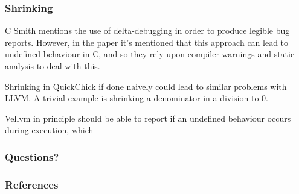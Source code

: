 \documentclass{beamer}
\begin{document}
\begin{frame}
  \frametitle{Shrinking}

  C Smith mentions the use of delta-debugging in order to produce
  legible bug reports. However, in the paper it's mentioned that this
  approach can lead to undefined behaviour in C, and so they rely upon
  compiler warnings and static analysis to deal with this.

  Shrinking in QuickChick if done naively could lead to similar
  problems with LLVM. A trivial example is shrinking a denominator in
  a division to 0.

  Vellvm in principle should be able to report if an undefined
  behaviour occurs during execution, which 
\end{frame}

\begin{frame}
  \frametitle{Questions?}

\end{frame}

\begin{frame}
  \frametitle{References}

  \nocite{*}
  \printbibliography
\end{frame}
\end{document}
